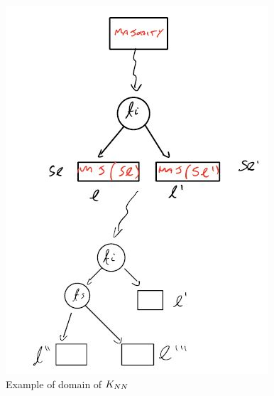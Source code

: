 \documentclass[../main.tex]{subfiles}
\begin{document}
\begin{figure}[h]
    \centering
    \includegraphics[width=0.7\linewidth]{../img/lez4-img7.JPG}
    \caption{Example of domain of $K_{NN}$}
\end{figure}
\end{document}
